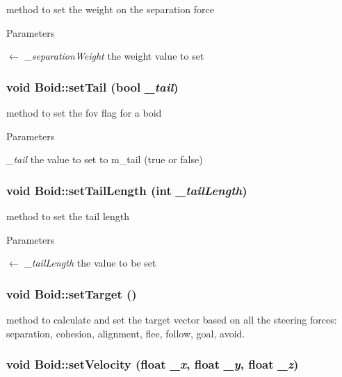method to set the weight on the separation force 
\begin{DoxyParams}{Parameters}
\item[\mbox{$\leftarrow$} {\em \_\-separationWeight}]the weight value to set \end{DoxyParams}
\hypertarget{classBoid_a761d48b1e156b4da4edad7854a59daa8}{
\subsubsection[{setTail}]{\setlength{\rightskip}{0pt plus 5cm}void Boid::setTail (bool {\em \_\-tail})}}
\label{classBoid_a761d48b1e156b4da4edad7854a59daa8}


method to set the fov flag for a boid 
\begin{DoxyParams}{Parameters}
\item[{\em \_\-tail}]the value to set to m\_\-tail (true or false) \end{DoxyParams}
\hypertarget{classBoid_ae5c5816d17ad825545455a6fad47f9ae}{
\subsubsection[{setTailLength}]{\setlength{\rightskip}{0pt plus 5cm}void Boid::setTailLength (int {\em \_\-tailLength})}}
\label{classBoid_ae5c5816d17ad825545455a6fad47f9ae}


method to set the tail length 
\begin{DoxyParams}{Parameters}
\item[\mbox{$\leftarrow$} {\em \_\-tailLength}]the value to be set \end{DoxyParams}
\hypertarget{classBoid_aa1144dbf8050c06e5a89db5f84411dd6}{
\subsubsection[{setTarget}]{\setlength{\rightskip}{0pt plus 5cm}void Boid::setTarget ()}}
\label{classBoid_aa1144dbf8050c06e5a89db5f84411dd6}


method to calculate and set the target vector based on all the steering forces: separation, cohesion, alignment, flee, follow, goal, avoid. \hypertarget{classBoid_a610fd5764690285c3c81135c30162633}{
\subsubsection[{setVelocity}]{\setlength{\rightskip}{0pt plus 5cm}void Boid::setVelocity (float {\em \_\-x}, \/  float {\em \_\-y}, \/  float {\em \_\-z})}}
\label{classBoid_a610fd5764690285c3c81135c30162633}


